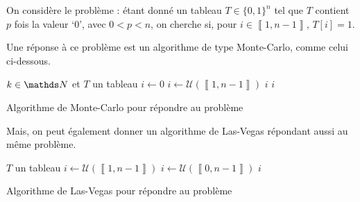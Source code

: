 \begin{exm}
	On considère le problème : étant donné un tableau $T \in \{0,1\}^n$ tel que $T$\/ contient $p$\/ fois la valeur `0', avec $0 < p < n$, on cherche si, pour $i \in \left\llbracket 1,n-1 \right\rrbracket$, $T[i] = 1$.

	Une réponse à ce problème est un algorithme de type {\sc Monte-Carlo}, comme celui ci-dessous.
	\begin{algorithm}[H]
		\centering
		\begin{algorithmic}[1]
			\Entree $k \in \N$\/ et $T$\/ un tableau
			\State $i \gets 0$
				\State $i \gets \mathcal{U}(\left\llbracket 1,n-1 \right\rrbracket)$
					\State\Return $i$
				\EndIf
			\EndFor
			\State \Return $i$
		\end{algorithmic}
		\caption{Algorithme de {\sc Monte-Carlo} pour répondre au problème}
	\end{algorithm}
	Mais, on peut également donner un algorithme de {\sc Las-Vegas}\/ répondant aussi au même problème.
	\begin{algorithm}[H]
		\centering
		\begin{algorithmic}[1]
			\Entree $T$\/ un tableau
			\State $i \gets \mathcal{U}(\left\llbracket 1,n-1 \right\rrbracket)$
				\State $i \gets \mathcal{U}(\left\llbracket 0,n-1 \right\rrbracket)$
			\EndWhile
			\State\Return $i$
		\end{algorithmic}
		\caption{Algorithme de {\sc Las-Vegas} pour répondre au problème}
	\end{algorithm}


\end{exm}
